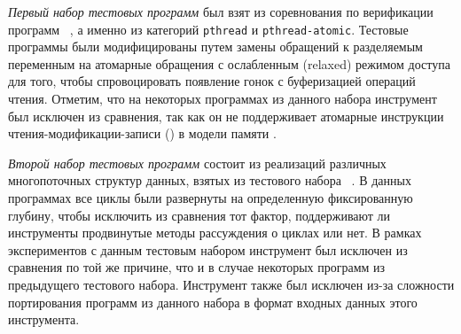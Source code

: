 \textit{Первый набор тестовых программ} был взят 
из соревнования по верификации программ \SVCOMP~\cite{SVCOMP}, 
а именно из категорий \texttt{pthread} и \texttt{pthread-atomic}.
Тестовые программы были модифицированы путем замены 
обращений к разделяемым переменным на атомарные обращения 
с ослабленным (relaxed) режимом доступа 
для того, чтобы спровоцировать появление гонок с буферизацией операций чтения. 
Отметим, что на некоторых программах из данного набора 
инструмент \Nidhugg был исключен из сравнения, так как он не поддерживает 
атомарные инструкции чтения-модификации-записи (\RMW) в модели памяти \POWER. 

\textit{Второй набор тестовых программ} состоит из 
реализаций различных многопоточных структур данных, 
взятых из тестового набора \CDSChecker~\cite{Norris-Demsky:OOPSLA2013}. 
В данных программах все циклы были развернуты 
на определенную фиксированную глубину, чтобы исключить из сравнения тот фактор, 
поддерживают ли инструменты продвинутые методы рассуждения о циклах или нет. 
В рамках экспериментов с данным тестовым набором инструмент \Nidhugg 
был исключен из сравнения по той же причине, что 
и в случае некоторых программ из предыдущего тестового набора. 
Инструмент \rmem также был исключен из-за сложности портирования 
программ из данного набора в формат входных данных этого инструмента.



